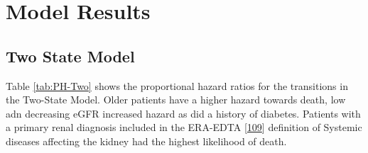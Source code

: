 \documentclass[12pt,PhD,twoside,openright]{muthesis}
\begin{document}
\hypertarget{model-results}{%
\section{Model Results}\label{model-results}}

\hypertarget{two-state-model}{%
\subsection{Two State Model}\label{two-state-model}}

Table \ref{tab:PH-Two} shows the proportional hazard ratios for the transitions in the Two-State Model. Older patients have a higher hazard towards death, low adn decreasing eGFR increased hazard as did a history of diabetes. Patients with a primary renal diagnosis included in the ERA-EDTA {[}\protect\hyperlink{ref-venkat-raman_new_2012}{109}{]} definition of Systemic diseases affecting the kidney had the highest likelihood of death.
\end{document}
